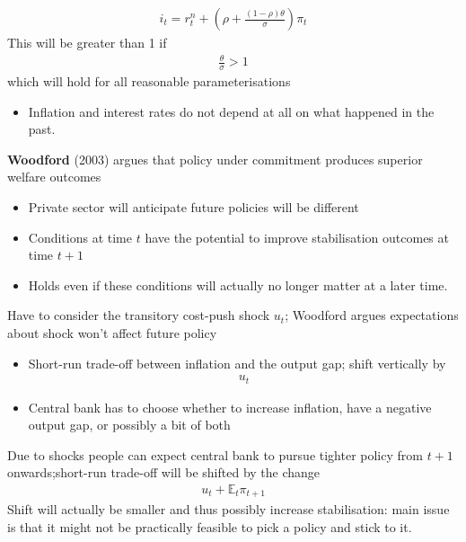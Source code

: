 \documentclass{beamer}
\begin{document}
\begin{frame}
  \begin{align}
  i_t=r_t^n+ \left( \rho + \frac{(1-\rho)\theta}{\sigma} \right) \pi_t
\end{align}
\medskip
This will be greater than 1 if 
\begin{align}
 \frac{\theta}{\sigma}>1 
\end{align}
\medskip
 which will hold for all reasonable parameterisations
\begin{itemize}
   \item Inflation and interest rates do not depend at all on what happened in the past.
 \end{itemize} 
\end{frame}

\begin{frame}
  \textbf{Woodford} (2003) argues that policy under commitment produces superior welfare outcomes
  \begin{itemize}
    \item Private sector will anticipate future policies will be different
    \item Conditions at time $t$ have the potential to improve stabilisation outcomes at time $t+1$
    \item Holds even if these conditions will actually no longer matter at a later time. 
  \end{itemize}
\end{frame}

\begin{frame}
  Have to consider the transitory cost-push shock $u_t$; Woodford argues expectations about shock won't affect future policy
  \begin{itemize}
    \item Short-run trade-off between inflation and the output gap; shift vertically by
    \begin{align}
       u_t
     \end{align} 
    \item Central bank has to choose whether to increase inflation, have a negative output gap, or possibly a bit of both
  \end{itemize}
  Due to shocks people can expect central bank to pursue tighter policy from $t+1$ onwards;short-run trade-off will be shifted by the change 
  \begin{align}
   u_t+\mathbb{E}_t\pi_{t+1} 
  \end{align}
  Shift will actually be smaller and thus possibly increase stabilisation: main issue is that it might not be practically feasible to pick a policy and stick to it.   
\end{frame}
\end{document}
